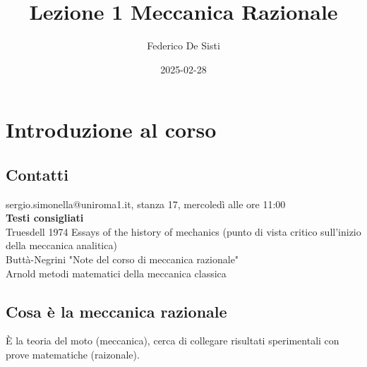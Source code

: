 \documentclass[12px]{article}
\title{Lezione 1 Meccanica Razionale}
\date{2025-02-28}
\author{Federico De Sisti}
\begin{document}
	\maketitle
	\newpage
	\section{Introduzione al corso}
	\subsection{Contatti}
	sergio.simonella@uniroma1.it, stanza 17, mercoledì alle ore 11:00\\ 
	\textbf{Testi consigliati}\\
	Truesdell 1974 Essays of the history of mechanics (punto di vista critico sull'inizio della meccanica analitica)\\
	Buttà-Negrini "Note del corso di meccanica razionale"\\
	Arnold metodi matematici della meccanica classica
	\subsection{Cosa è la meccanica razionale}
	È la teoria del moto (meccanica), cerca di collegare risultati sperimentali con prove matematiche (raizonale).\\
\end{document}
